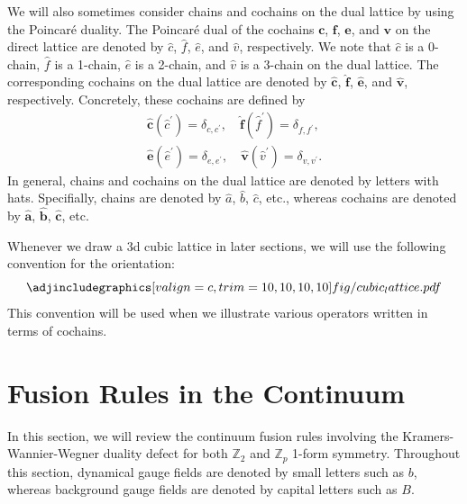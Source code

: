 \documentclass[aps,twocolumn,prx,floatfix,preprintnumbers, nofootinbib,10pt]{revtex4-2}
\numberwithin{equation}{section}
\theoremstyle{definition}
\theoremstyle{remark}
\theoremstyle{claim}
\newcommand{\Z}{{\mathbb Z}}
\begin{document}
\vspace*{\baselineskip}
We will also sometimes consider chains and cochains on the dual lattice by using the Poincar\'{e} duality.
The Poincar\'{e} dual of the cochains $\bm{c}$, $\bm{f}$, $\bm{e}$, and $\bm{v}$ on the direct lattice are denoted by $\hat{c}$, $\hat{f}$, $\hat{e}$, and $\hat{v}$, respectively.
We note that $\hat{c}$ is a 0-chain, $\hat{f}$ is a 1-chain, $\hat{e}$ is a 2-chain, and $\hat{v}$ is a 3-chain on the dual lattice.
The corresponding cochains on the dual lattice are denoted by $\hat{\bm{c}}$, $\hat{\bm{f}}$, $\hat{\bm{e}}$, and $\hat{\bm{v}}$, respectively.
Concretely, these cochains are defined by
\begin{equation}
\begin{aligned}
\hat{\bm{c}}(\hat{c}^{\prime}) = \delta_{c, c^{\prime}}, \quad
\hat{\bm{f}}(\hat{f}^{\prime}) = \delta_{f, f^{\prime}}, \\
\hat{\bm{e}}(\hat{e}^{\prime}) = \delta_{e, e^{\prime}}, \quad
\hat{\bm{v}}(\hat{v}^{\prime}) = \delta_{v, v^{\prime}}.
\end{aligned}
\end{equation}
In general, chains and cochains on the dual lattice are denoted by letters with hats.
Specifially, chains are denoted by $\hat{a}$, $\hat{b}$, $\hat{c}$, etc., whereas cochains are denoted by $\hat{\bm{a}}$, $\hat{\bm{b}}$, $\hat{\bm{c}}$, etc.

\vspace*{\baselineskip}
Whenever we draw a 3d cubic lattice in later sections, we will use the following convention for the orientation:
\begin{equation}
\adjincludegraphics[valign=c, trim={10, 10, 10, 10}]{fig/cubic_lattice.pdf}
\end{equation}
This convention will be used when we illustrate various operators written in terms of cochains.








\section{Fusion Rules in the Continuum}
\label{sec: Fusion Rules in the Continuum}


In this section, we will review the continuum fusion rules involving the Kramers-Wannier-Wegner duality defect for both $\Z_2$ and $\Z_p$ 1-form symmetry.
Throughout this section, dynamical gauge fields are denoted by small letters such as $b$, whereas background gauge fields are denoted by capital letters such as $B$.
\end{document}
